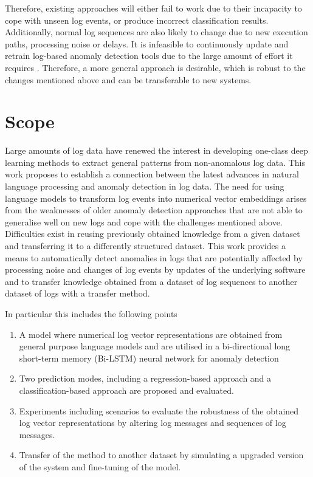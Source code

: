 Therefore, existing approaches will either fail to work due to their incapacity to cope with unseen log events, or produce incorrect classification results. Additionally, normal log sequences are also likely to change due to new execution paths, processing noise or delays. It is infeasible to continuously update and retrain log-based anomaly detection tools due to the large amount of effort it requires \cite{zhang2019robust}. Therefore, a more general approach is desirable, which is robust to the changes mentioned above and can be transferable to new systems.








\section{Scope\label{sec:scope}}
Large amounts of log data have renewed the interest in developing one-class deep learning methods to extract general patterns from non-anomalous log data. This work proposes to establish a connection between the latest advances in natural language processing and anomaly detection in log data. The need for using language models to transform log events into numerical vector embeddings arises from the weaknesses of older anomaly detection approaches that are not able to generalise well on new logs and cope with the challenges mentioned above. Difficulties exist in reusing previously obtained knowledge from a given dataset and transferring it to a differently structured dataset. This work provides a means to automatically detect anomalies in logs that are potentially affected by processing noise and changes of log events by updates of the underlying software and to transfer knowledge obtained from a dataset of log sequences to another dataset of logs with a transfer method.

In particular this includes the following points
\begin{enumerate}
	\item A model where numerical log vector representations are obtained from general purpose language models and are utilised in a bi-directional long short-term memory (Bi-LSTM) neural network for anomaly detection
	\item Two prediction modes, including a regression-based approach and a classification-based approach are proposed and evaluated.
	\item Experiments including scenarios to evaluate the robustness of the obtained log vector representations by altering log messages and sequences of log messages.
	\item Transfer of the method to another dataset by simulating a upgraded version of the system and fine-tuning of the model.
\end{enumerate}

